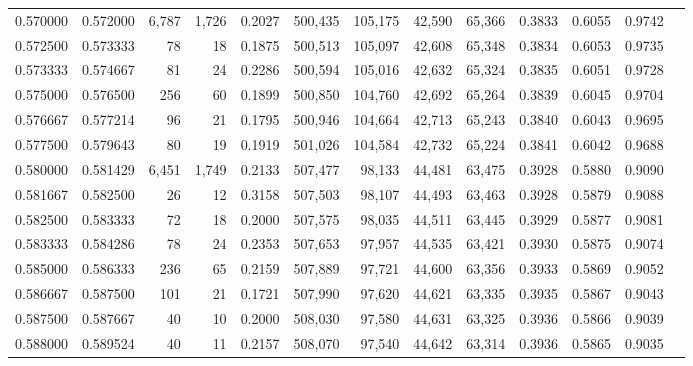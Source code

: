 \begin{tabular}{rrrrrrrrrrrrr}
0.570000 & 0.572000 &  6,787 & 1,726 &                                     0.2027 & 500,435 & 105,175 &  42,590 &  65,366 & 0.3833 & 0.6055 & 0.9742 \\
0.572500 & 0.573333 &     78 &    18 &                                     0.1875 & 500,513 & 105,097 &  42,608 &  65,348 & 0.3834 & 0.6053 & 0.9735 \\
0.573333 & 0.574667 &     81 &    24 &                                     0.2286 & 500,594 & 105,016 &  42,632 &  65,324 & 0.3835 & 0.6051 & 0.9728 \\
0.575000 & 0.576500 &    256 &    60 &                                     0.1899 & 500,850 & 104,760 &  42,692 &  65,264 & 0.3839 & 0.6045 & 0.9704 \\
0.576667 & 0.577214 &     96 &    21 &                                     0.1795 & 500,946 & 104,664 &  42,713 &  65,243 & 0.3840 & 0.6043 & 0.9695 \\
0.577500 & 0.579643 &     80 &    19 &                                     0.1919 & 501,026 & 104,584 &  42,732 &  65,224 & 0.3841 & 0.6042 & 0.9688 \\
0.580000 & 0.581429 &  6,451 & 1,749 &                                     0.2133 & 507,477 &  98,133 &  44,481 &  63,475 & 0.3928 & 0.5880 & 0.9090 \\
0.581667 & 0.582500 &     26 &    12 &                                     0.3158 & 507,503 &  98,107 &  44,493 &  63,463 & 0.3928 & 0.5879 & 0.9088 \\
0.582500 & 0.583333 &     72 &    18 &                                     0.2000 & 507,575 &  98,035 &  44,511 &  63,445 & 0.3929 & 0.5877 & 0.9081 \\
0.583333 & 0.584286 &     78 &    24 &                                     0.2353 & 507,653 &  97,957 &  44,535 &  63,421 & 0.3930 & 0.5875 & 0.9074 \\
0.585000 & 0.586333 &    236 &    65 &                                     0.2159 & 507,889 &  97,721 &  44,600 &  63,356 & 0.3933 & 0.5869 & 0.9052 \\
0.586667 & 0.587500 &    101 &    21 &                                     0.1721 & 507,990 &  97,620 &  44,621 &  63,335 & 0.3935 & 0.5867 & 0.9043 \\
0.587500 & 0.587667 &     40 &    10 &                                     0.2000 & 508,030 &  97,580 &  44,631 &  63,325 & 0.3936 & 0.5866 & 0.9039 \\
0.588000 & 0.589524 &     40 &    11 &                                     0.2157 & 508,070 &  97,540 &  44,642 &  63,314 & 0.3936 & 0.5865 & 0.9035 \\

\end{tabular}
